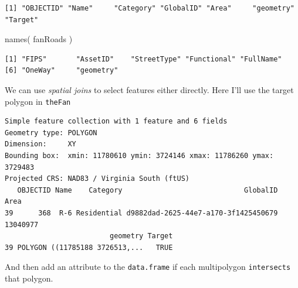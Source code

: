 \documentclass[
  letterpaper,
]{book}
\newenvironment{Shaded}{\begin{snugshade}}{\end{snugshade}}
\newcommand{\AttributeTok}[1]{\textcolor[rgb]{0.40,0.45,0.13}{#1}}
\newcommand{\ConstantTok}[1]{\textcolor[rgb]{0.56,0.35,0.01}{#1}}
\newcommand{\DecValTok}[1]{\textcolor[rgb]{0.68,0.00,0.00}{#1}}
\newcommand{\FunctionTok}[1]{\textcolor[rgb]{0.28,0.35,0.67}{#1}}
\newcommand{\NormalTok}[1]{\textcolor[rgb]{0.00,0.23,0.31}{#1}}
\newcommand{\OtherTok}[1]{\textcolor[rgb]{0.00,0.23,0.31}{#1}}
\newcommand{\SpecialCharTok}[1]{\textcolor[rgb]{0.37,0.37,0.37}{#1}}
\begin{document}
\begin{verbatim}
[1] "OBJECTID" "Name"     "Category" "GlobalID" "Area"     "geometry" "Target"  
\end{verbatim}

\begin{Shaded}
\begin{Highlighting}[]
\FunctionTok{names}\NormalTok{( fanRoads )}
\end{Highlighting}
\end{Shaded}

\begin{verbatim}
[1] "FIPS"       "AssetID"    "StreetType" "Functional" "FullName"  
[6] "OneWay"     "geometry"  
\end{verbatim}

We can use \emph{spatial joins} to select features either directly. Here
I'll use the target polygon in \texttt{theFan}

\begin{Shaded}
\end{Shaded}

\begin{verbatim}
Simple feature collection with 1 feature and 6 fields
Geometry type: POLYGON
Dimension:     XY
Bounding box:  xmin: 11780610 ymin: 3724146 xmax: 11786260 ymax: 3729483
Projected CRS: NAD83 / Virginia South (ftUS)
   OBJECTID Name    Category                             GlobalID     Area
39      368  R-6 Residential d9882dad-2625-44e7-a170-3f1425450679 13040977
                         geometry Target
39 POLYGON ((11785188 3726513,...   TRUE
\end{verbatim}

And then add an attribute to the \texttt{data.frame} if each
multipolygon \texttt{intersects} that polygon.

\begin{Shaded}
\end{Shaded}
\end{document}
